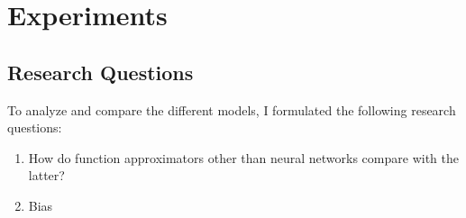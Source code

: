 
\chapter{Experiments}
\label{ch:experiments}

\section{Research Questions}
To analyze and compare the different models, I formulated the following research questions:
\begin{enumerate}
  \item How do function approximators other than neural networks compare with the latter?
  \item Bias
\end{enumerate}

